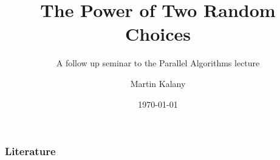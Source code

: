 \documentclass{beamer}
\title{The Power of Two Random Choices}
\subtitle{A follow up seminar to the Parallel Algorithms lecture}
\author{Martin Kalany}
\institute
{
  
  Graduate student in Computer Science\\
  Vienna University of Technology\\
}
\date{\today}
\begin{document}
\frame{\titlepage}

\begin{frame}
\cite{mitzen01}
\end{frame}

\begin{frame}[allowframebreaks]
\frametitle<presentation>{Literature}    
\printbibliography
\end{frame} 	 
\end{document}

